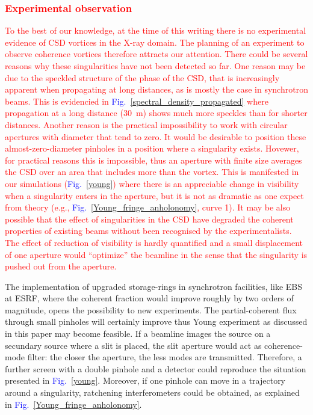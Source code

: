 \documentclass[%
 reprint,
 amsmath,amssymb,
 aps,
]{revtex4-1}
\begin{document}
\textcolor{red}{
\subsubsection{Experimental observation} 
To the best of our knowledge, at the time of this writing there is no experimental evidence of CSD vortices in the X-ray domain.  The planning of an experiment to observe  coherence vortices therefore attracts our attention. There could be several reasons why these singularities have not been detected so far. One reason may be due to the speckled structure of the phase of the CSD, that is increasingly apparent when propagating at long distances, as is mostly the case in synchrotron beams. This is evidencied in \textcolor{blue}{Fig.~\ref{spectral_density_propagated}} where propagation at a long distance (30~m) shows much more speckles than for shorter distances. Another reason is the practical impossibility to work with circular apertures with diameter that tend to zero. It would be desirable to position these almost-zero-diameter pinholes in a position where a singularity exists. Hovewer, for practical reasons this is impossible, thus an aperture with finite size averages the CSD over an area that includes more than the vortex. This is manifested in our simulations (\textcolor{blue}{Fig.~\ref{young}}) where there is an appreciable change in visibility when a singularity enters in the aperture, but it is not as dramatic as one expect from theory (e.g., \textcolor{blue}{Fig.~\ref{Young_fringe_anholonomy}}, curve 1). It may be also possible that the effect of singularities in the CSD have degraded the coherent properties of existing beams without been recognised by the experimentalists. The effect of reduction of visibility is hardly quantified and a small displacement of one aperture would ``optimize'' the beamline in the sense that the singularity is pushed out from the aperture.}  

The implementation of upgraded storage-rings in synchrotron facilities, like EBS at ESRF, where the coherent fraction would improve roughly by two orders of magnitude, opens the possibility to new experiments. The partial-coherent flux through small pinholes will certainly improve thus Young experiment as discussed in this paper may become feasible. If a beamline images the source on a secundary source where a slit is placed, the slit aperture would act as coherence-mode filter: the closer the aperture, the less modes are transmitted. Therefore, a further screen with a double pinhole and a detector could reproduce the situation presented in \textcolor{blue}{Fig.~\ref{young}}. Moreover, if one pinhole can move in a trajectory around a singularity, ratchening interferometers could be obtained, as explained in \textcolor{blue}{Fig.~\ref{Young_fringe_anholonomy}}. 
\end{document}
